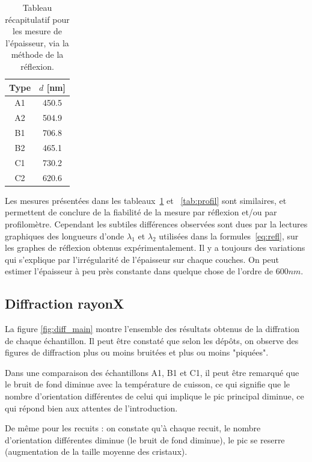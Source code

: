 \documentclass[a4paper,12pt,oneside]{article}
\begin{document}
\begin{table}[ht]
   \centering
   \begin{tabular}{|c|c|}
	  \hline
      Type & $d$ [nm]\\
      \hline
      A1 & 450.5 \\
      A2 & 504.9 \\
      B1 & 706.8 \\
      B2 & 465.1 \\
      C1 & 730.2 \\
      C2 & 620.6 \\
      \hline
   \end{tabular}
   \caption{Tableau récapitulatif pour les mesure de l'épaisseur, via la méthode de la réflexion.}\label{tab:epaisseur}
\end{table}

Les mesures présentées dans les tableaux~\ref{tab:epaisseur} et ~\ref{tab:profil} sont similaires, et permettent de conclure de la fiabilité de la mesure par réflexion et/ou par profilomètre. Cependant les subtiles différences observées sont dues par la lectures graphiques des longueurs d'onde $\lambda_1$ et $\lambda_2$ utilisées dans la formules~\ref{eq:refl}, sur les graphes de réflexion obtenus expérimentalement. Il y a toujours des variations qui s'explique par l'irrégularité de l'épaisseur sur chaque couches. On peut estimer l'épaisseur à peu près constante dans quelque chose de l'ordre de $600 nm$.

\subsection{Diffraction rayonX}
La figure \ref{fig:diff_main} montre l'ensemble des résultats obtenus de la diffration de chaque échantillon. Il peut être constaté que selon les dépôts, on observe des figures de diffraction plus ou moins bruitées et plus ou moins "piquées".

Dans une comparaison des échantillons A1, B1 et C1, il peut être remarqué que le bruit de fond diminue avec la température de cuisson, ce qui signifie que le nombre d'orientation différentes de celui qui implique le pic principal diminue, ce qui répond bien aux attentes de l'introduction.

De même pour les recuits : on constate qu'à chaque recuit, le nombre d'orientation différentes diminue (le bruit de fond diminue), le pic se reserre (augmentation de la taille moyenne des cristaux).
\end{document}
